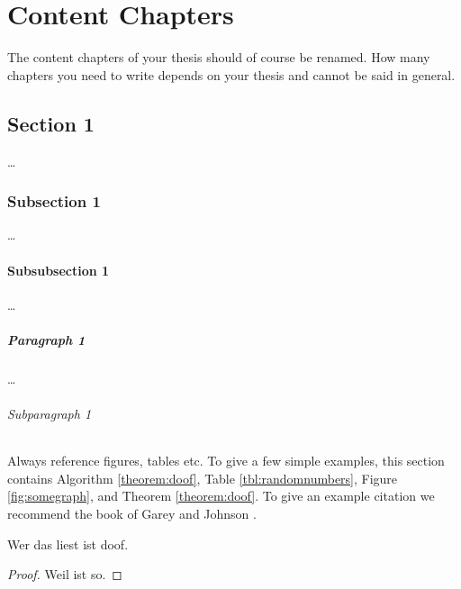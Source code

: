 
\chapter{Content Chapters}
\label{ch:Content1}

The content chapters of your thesis should of course be renamed. How many chapters you need to write depends on your thesis and cannot be said in general.


\section{Section 1}

\dots

\subsection{Subsection 1}

\dots

\subsubsection{Subsubsection 1}

\dots

\paragraph{Paragraph 1}

\dots

\subparagraph{Subparagraph 1} Always reference figures, tables etc. To give a few simple examples, this section contains Algorithm \ref{theorem:doof}, Table \ref{tbl:randomnumbers}, Figure \ref{fig:somegraph}, and Theorem \ref{theorem:doof}. To give an example citation we recommend the book of Garey and Johnson \cite{gj-ci-79}.

\begin{theorem}
\label{theorem:doof}
  Wer das liest ist doof.
\end{theorem}
\begin{proof}
  Weil ist so.
\end{proof}

